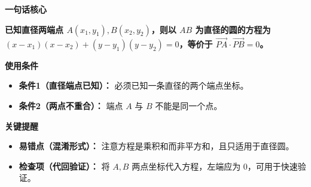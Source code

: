 \begin{summarybox}
	\textbf{\textcolor{CSummary}{一句话核心}}

	\textbf{已知直径两端点 $A(x_1,y_1),B(x_2,y_2)$，则以 $AB$ 为直径的圆的方程为 $(x-x_1)(x-x_2)+(y-y_1)(y-y_2)=0$，等价于 $\overrightarrow{PA}\cdot\overrightarrow{PB}=0$。}

	\medskip
	\textbf{\textcolor{CSummary}{使用条件}}
	\begin{itemize}[leftmargin=*, itemsep=0.5em, topsep=0.4em]
		\item \textbf{条件1（直径端点已知）：} 必须已知一条直径的两个端点坐标。
		\item \textbf{条件2（两点不重合）：} 端点 $A$ 与 $B$ 不能是同一个点。
	\end{itemize}

	\medskip
	\textbf{\textcolor{CSummary}{关键提醒}}
	\begin{itemize}[leftmargin=*, itemsep=0.5em, topsep=0.4em]
		\item \textbf{易错点（混淆形式）：} 注意方程是乘积和而非平方和，且只适用于直径圆。
		\item \textbf{检查项（代回验证）：} 将 $A,B$ 两点坐标代入方程，左端应为 $0$，可用于快速验证。
	\end{itemize}
\end{summarybox}
